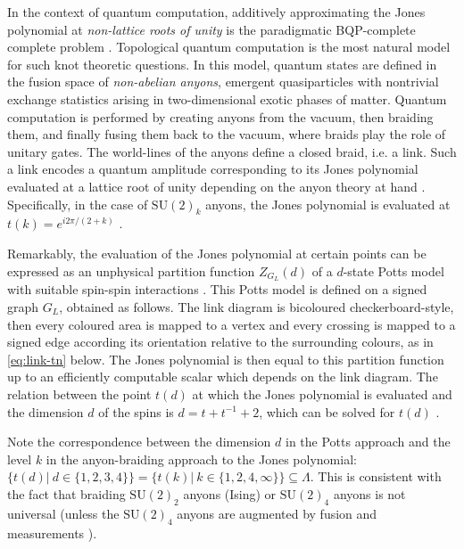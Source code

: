In the context of quantum computation,
additively approximating the Jones polynomial at \emph{non-lattice roots of unity} is the paradigmatic BQP-complete complete problem \cite{Aharonov_2008,kuperberg2014hard}.
Topological quantum computation \cite{Freedman2002,pachos_2012} is the most natural model for such knot theoretic questions. In this model, quantum states are defined in the fusion space of \emph{non-abelian anyons}, emergent quasiparticles with nontrivial exchange statistics arising in two-dimensional exotic phases of matter.
Quantum computation is performed by creating anyons from the vacuum, then braiding them, and finally fusing them back to the vacuum, where braids play the role of unitary gates.
The world-lines of the anyons define a closed braid, i.e. a link.
Such a link encodes a quantum amplitude corresponding to its Jones polynomial evaluated at a lattice root of unity depending on the anyon theory at hand \cite{Witten1989}. 
Specifically, in the case of $\text{SU}(2)_k$ anyons, the Jones polynomial is evaluated at $t(k) = e^{i 2\pi/(2+k)}$ \cite{Rowell_2018}.

Remarkably, the evaluation of the Jones polynomial at certain points can be expressed as an unphysical partition function $Z_{G_L}(d)$ of a $d$-state Potts model with suitable spin-spin interactions \cite{RevModPhys.64.1099}.
This Potts model is defined on a signed graph $G_L$, obtained as follows.
The link diagram is bicoloured checkerboard-style,
then every coloured area is mapped to a vertex and every crossing is mapped to a signed edge according
its orientation relative to the surrounding colours, as in \eqref{eq:link-tn} below.
The Jones polynomial is then equal to this partition function up to an efficiently computable scalar which depends on the link diagram.  
The relation between the point $t(d)$ at which the Jones polynomial is evaluated and the dimension $d$ of the spins is $d = t + t^{-1} +2$,
which can be solved for $t(d)$ \cite{PhysRevE.100.033303}.

Note the correspondence between the dimension $d$ in the Potts approach and the level $k$ in the anyon-braiding approach to the Jones polynomial: $\{t(d) | ~ d \in\{1,2,3,4\} \} = \{ t(k) | ~ k\in\{1,2,4,\infty\} \} \subseteq \Lambda$.
This is consistent with the fact that braiding $\text{SU}(2)_2$ anyons (Ising) or $\text{SU}(2)_4$ anyons is not universal (unless the $\text{SU}(2)_4$ anyons are augmented by fusion and measurements \cite{Levaillant_2015}).

